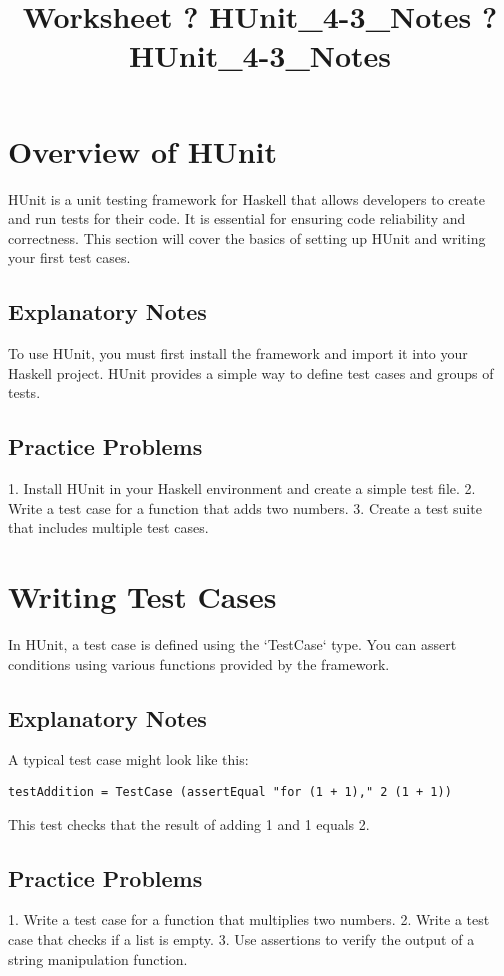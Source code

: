 \documentclass{article}
\title{Worksheet ? HUnit\_4-3\_Notes ? HUnit\_4-3\_Notes}
\author{}
\date{}
\begin{document}
\maketitle

\section*{Overview of HUnit}
HUnit is a unit testing framework for Haskell that allows developers to create and run tests for their code. It is essential for ensuring code reliability and correctness. This section will cover the basics of setting up HUnit and writing your first test cases.

\subsection*{Explanatory Notes}
To use HUnit, you must first install the framework and import it into your Haskell project. HUnit provides a simple way to define test cases and groups of tests.

\subsection*{Practice Problems}
1. Install HUnit in your Haskell environment and create a simple test file.
2. Write a test case for a function that adds two numbers.
3. Create a test suite that includes multiple test cases.

\section*{Writing Test Cases}
In HUnit, a test case is defined using the `TestCase` type. You can assert conditions using various functions provided by the framework.

\subsection*{Explanatory Notes}
A typical test case might look like this:

\begin{verbatim}
testAddition = TestCase (assertEqual "for (1 + 1)," 2 (1 + 1))
\end{verbatim}

This test checks that the result of adding 1 and 1 equals 2.

\subsection*{Practice Problems}
1. Write a test case for a function that multiplies two numbers.
2. Write a test case that checks if a list is empty.
3. Use assertions to verify the output of a string manipulation function.
\end{document}
